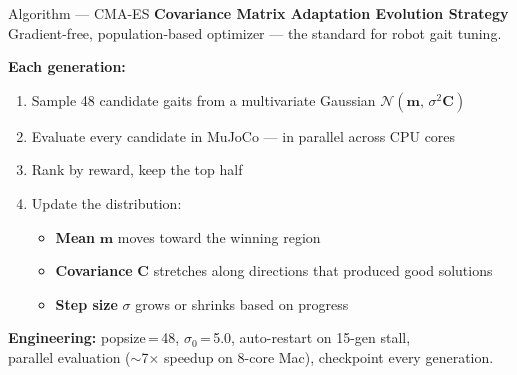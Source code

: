 \documentclass[aspectratio=169]{beamer}
\begin{document}
\begin{frame}{Algorithm --- CMA-ES}
\textbf{Covariance Matrix Adaptation Evolution Strategy}\\[0.3em]
Gradient-free, population-based optimizer --- the standard for robot gait tuning.

\vspace{0.5em}
\textbf{Each generation:}
\begin{enumerate}
    \item Sample 48 candidate gaits from a multivariate Gaussian $\mathcal{N}(\mathbf{m},\,\sigma^2 \mathbf{C})$
    \item Evaluate every candidate in MuJoCo --- in parallel across CPU cores
    \item Rank by reward, keep the top half
    \item Update the distribution:
    \begin{itemize}
        \item \textbf{Mean} $\mathbf{m}$ moves toward the winning region
        \item \textbf{Covariance} $\mathbf{C}$ stretches along directions that produced good solutions
        \item \textbf{Step size} $\sigma$ grows or shrinks based on progress
    \end{itemize}
\end{enumerate}

\vspace{0.5em}
\textbf{Engineering:} popsize\,=\,48, $\sigma_0$\,=\,5.0, auto-restart on 15-gen stall,\\
parallel evaluation ($\sim$7$\times$ speedup on 8-core Mac), checkpoint every generation.
\end{frame}
\end{document}
